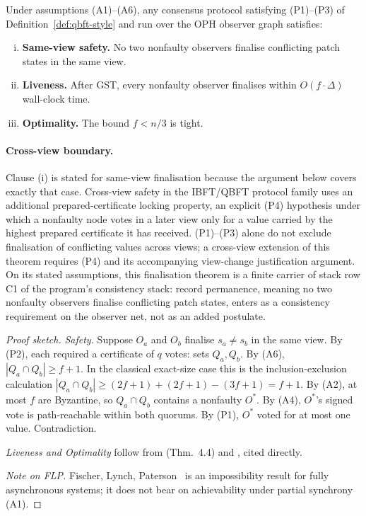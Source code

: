 \begin{theorem}
\label{thm:qbft-safety}
Under assumptions (A1)--(A6), any consensus protocol satisfying
(P1)--(P3) of Definition~\ref{def:qbft-style} and run over the
\textrm{OPH} observer graph satisfies:
\begin{enumerate}[(i)]
  \item \textbf{Same-view safety.} No two nonfaulty observers finalise
        conflicting patch states in the same view.
  \item \textbf{Liveness.} After \textrm{GST}, every nonfaulty observer
        finalises within $O(f\cdot\Delta)$ wall-clock time.
  \item \textbf{Optimality.} The bound $f<n/3$ is tight.
\end{enumerate}
\end{theorem}

\paragraph{Cross-view boundary.}
Clause (i) is stated for same-view finalisation because the argument below
covers exactly that case. Cross-view safety in the IBFT/QBFT protocol family
uses an additional prepared-certificate locking property, an explicit
(P4) hypothesis under which a nonfaulty node votes in a later view only for
a value carried by the highest prepared certificate it has received.
(P1)--(P3) alone do not exclude finalisation of conflicting values across
views; a cross-view extension of this theorem requires (P4) and its
accompanying view-change justification argument.
On its stated assumptions, this finalisation theorem is a finite carrier of stack row C1 of
the program's consistency stack: record permanence, meaning no two nonfaulty observers finalise
conflicting patch states, enters as a consistency requirement on the observer net, not as an
added postulate.

\begin{proof}[Proof sketch]
\textit{Safety.}
Suppose $O_a$ and $O_b$ finalise $s_a\neq s_b$ in the same view.
By (P2), each required a certificate of $q$ votes: sets $Q_a,Q_b$.
By (A6), $|Q_a\cap Q_b|\geq f+1$.  In the classical exact-size case this is
the inclusion-exclusion calculation
$|Q_a\cap Q_b|\geq(2f+1)+(2f+1)-(3f+1)=f+1$.
By (A2), at most $f$ are Byzantine, so $Q_a\cap Q_b$ contains a
nonfaulty $O^*$.
By (A4), $O^*$'s signed vote is path-reachable within both quorums.
By (P1), $O^*$ voted for at most one value. Contradiction.

\textit{Liveness and Optimality}
follow from \cite{DLS88} (Thm.~4.4) and \cite{Lamport1982}, cited directly.

\textit{Note on FLP.}
Fischer, Lynch, Paterson~\cite{FLP85} is an impossibility result for
fully asynchronous systems; it does not bear on achievability under
partial synchrony (A1).
\end{proof}

